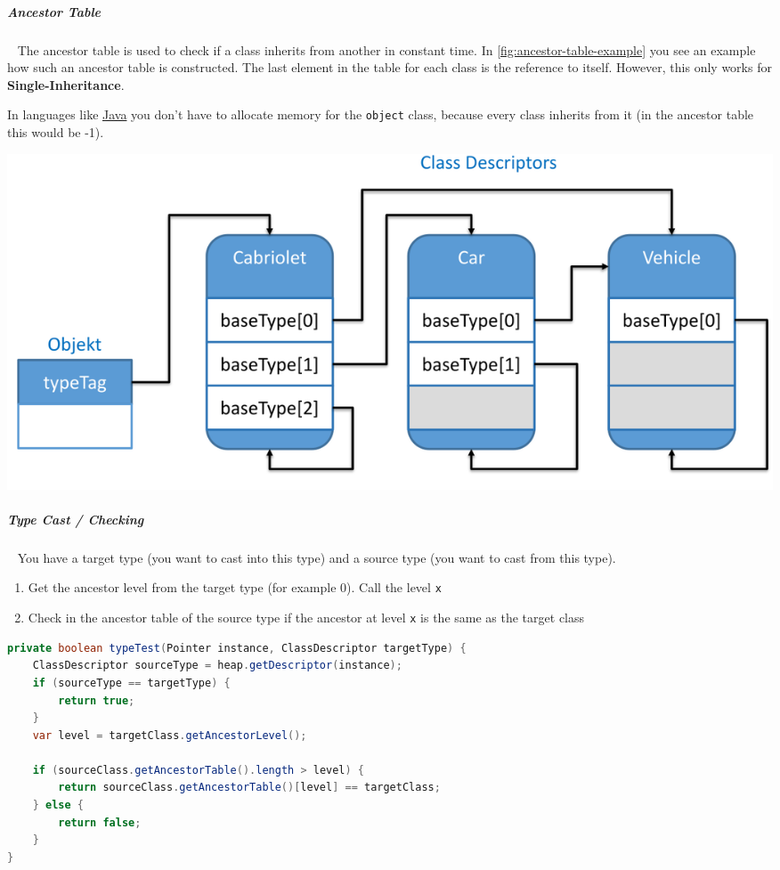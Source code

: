 \documentclass[11pt,twoside,landscape]{article}
\begin{document}
\begin{multicols}{3}
\subparagraph{Ancestor Table} \
\label{sec:org2661ff0}
The ancestor table is used to check if a class inherits from another in constant time.
In \autoref{fig:ancestor-table-example} you see an example how such an ancestor table is constructed.
The last element in the table for each class is the reference to itself.
However, this only works for \textbf{Single-Inheritance}.

In languages like \href{../../../roam/20201116150053-java.org}{Java} you don't have to allocate memory for the \texttt{object} class, because every class inherits from it (in the ancestor table this would be -1).

{
\begin{center}
\includegraphics[width=.9\linewidth]{img/ancestor_table.png}
\end{center}
\label{fig:ancestor-table-example}
}

\subparagraph{Type Cast / Checking} \
\label{sec:orge0d63c7}
You have a target type (you want to cast into this type) and a source type (you want to cast from this type).

\begin{enumerate}
\item Get the ancestor level from the target type (for example 0). Call the level \texttt{x}
\item Check in the ancestor table of the source type if the ancestor at level \texttt{x} is the same as the target class
\end{enumerate}


\begin{lstlisting}[language=java,numbers=none]
private boolean typeTest(Pointer instance, ClassDescriptor targetType) {
    ClassDescriptor sourceType = heap.getDescriptor(instance);
    if (sourceType == targetType) {
        return true;
    }
    var level = targetClass.getAncestorLevel();

    if (sourceClass.getAncestorTable().length > level) {
        return sourceClass.getAncestorTable()[level] == targetClass;
    } else {
        return false;
    }
}
\end{lstlisting}


\end{multicols}
\end{document}
